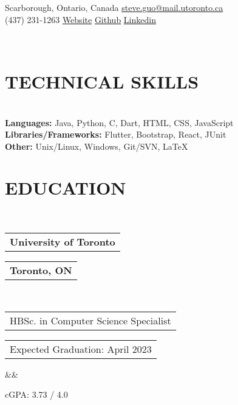 \documentclass[12pt,a4paper,roman]{moderncv}
\makeatletter
\def \scaleHeadings {1.2}
\newcommand*{\customcventry}[7][.25em]{
  \begin{tabular}{@{}l} 
    {\relscale{\scaleHeadings}\bfseries #4}
  \end{tabular}
  \hfill%
  \begin{tabular}{l@{}}
     {\bfseries #5}
  \end{tabular} \\
  \begin{tabular}{@{}l} 
    {#3}
  \end{tabular}
  \hfill%
  \begin{tabular}{l@{}}
     {#2}
  \end{tabular}
  \ifx&#7&
  \else{\\
    \begin{minipage}{\maincolumnwidth}
      \small#7
    \end{minipage}}\fi
  \par\addvspace{#1}}
\def \scaleFont {1.17} %
\def \spaceTop {12.5mm}
\def \headingSpace {-11mm}
\def \skillSpacing {1mm}
\makeatother
\begin{document}
\relscale{\scaleFont} %
\makecvtitle
\vspace*{-27mm}

\begin{center} 
	\faMapO\enspace Scarborough, Ontario, Canada  \qquad \faEnvelopeO\enspace \href{mailto:steve.guo@mail.utoronto.ca}{steve.guo@mail.utoronto.ca} \\
	\faMobile\enspace (437) 231-1263  \hspace*{\spaceTop}  \href{https://epicsteve2.github.io/}{\faGlobe\enspace Website}   \hspace*{\spaceTop}  \href{https://github.com/Epicsteve2}{\faGithub\enspace Github}   \hspace*{\spaceTop}  \href{https://www.linkedin.com/in/stephen-guo-399959192/}{\faLinkedin\enspace Linkedin}\\
\end{center} \leavevmode\\[-24mm]

\section{TECHNICAL SKILLS} \leavevmode \\[\headingSpace] 
\textbf{Languages:} Java,\hspace*{\skillSpacing} Python,\hspace*{\skillSpacing} C,\hspace*{\skillSpacing} Dart,\hspace*{\skillSpacing} HTML,\hspace*{\skillSpacing} CSS,\hspace*{\skillSpacing} JavaScript \\
\textbf{Libraries/Frameworks:} Flutter,\hspace*{\skillSpacing} Bootstrap,\hspace*{\skillSpacing} React,\hspace*{\skillSpacing } JUnit \\
\textbf{Other:} Unix/Linux,\hspace*{\skillSpacing} Windows,\hspace*{\skillSpacing} Git/SVN,\hspace*{\skillSpacing} LaTeX

\section{EDUCATION} \leavevmode \\[\headingSpace]
{\customcventry{Expected Graduation: April 2023}{HBSc. in Computer Science Specialist}{University of Toronto}{Toronto, ON}{}{}}
\vspace*{-1.5mm}
cGPA: 3.73 / 4.0
\end{document}
